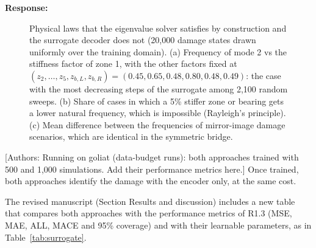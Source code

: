 \documentclass[11pt]{article}
\newenvironment{response}{\par\smallskip\noindent\color{resp}\textbf{Response:}\ }{\par}
\newcommand{\authornote}[1]{\textcolor{note}{\textsf{[Authors: #1]}}}
\begin{document}
\begin{response}
\begin{figure}[H]
		\caption{Physical laws that the eigenvalue solver satisfies by construction and the surrogate decoder does not (20,000 damage states drawn uniformly over the training domain). (a) Frequency of mode 2 vs the stiffness factor of zone 1, with the other factors fixed at $(z_2,\dots,z_5,z_{b,L},z_{b,R})=(0.45,0.65,0.48,0.80,0.48,0.49)$: the case with the most decreasing steps of the surrogate among 2,100 random sweeps. (b) Share of cases in which a 5\% stiffer zone or bearing gets a lower natural frequency, which is impossible (Rayleigh's principle). (c) Mean difference between the frequencies of mirror-image damage scenarios, which are identical in the symmetric bridge.}
		\label{fig:physics}
	\end{figure}
	\authornote{Running on goliat (data-budget runs): both approaches trained with 500 and 1,000 simulations. Add their performance metrics here.}
	Once trained, both approaches identify the damage with the encoder only, at the same cost.

	The revised manuscript (Section Results and discussion) includes a new table that compares both approaches with the performance metrics of R1.3 (MSE, MAE, ALL, MACE and 95\% coverage) and with their learnable parameters, as in Table~\ref{tab:surrogate}.

	

\end{response}
\end{document}
